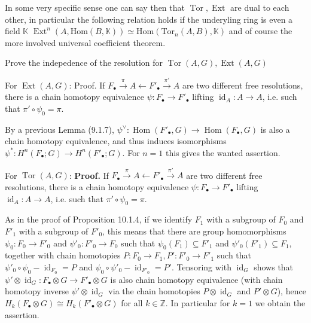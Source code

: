 In some very specific sense one can say then that \( \operatorname{Tor},\operatorname{Ext} \) are dual to each other,
in particular the following relation holds if the underyling ring is even a field \( \mathbb{K} \)
\( \operatorname{Ext}^n(A, \text{Hom}(B, \mathbb{K})) \simeq \text{Hom}(\text{Tor}_n(A, B), \mathbb{K}) \)
and of course the more involved universal coefficient theorem.


Prove the indepedence of the resolution for \( \operatorname{Tor}(A, G), \operatorname{Ext}(A, G) \)


For \( \operatorname{Ext}(A, G) \):
Proof. 
If \( F_{\bullet} \xrightarrow{\pi} A \leftarrow F'_{\bullet} \xrightarrow{\pi'} A \) are two different free resolutions, 
there is a chain homotopy equivalence \(\psi: F_{\bullet} \rightarrow F'_{\bullet}\) lifting \(\operatorname{id}_A : A \rightarrow A \), 
i.e. such that \(\pi' \circ \psi_0 = \pi\). 

By a previous Lemma (9.1.7), 
\(\psi^{\vee} : \operatorname{Hom}(F'_{\bullet}, G) \rightarrow \operatorname{Hom}(F_{\bullet}, G) \) is also a chain homotopy equivalence, 
and thus induces isomorphisms \(\psi^{\ast}: H^n(F_{\bullet}; G) \rightarrow H^n(F'_{\bullet}; G)\). 
For \(n = 1\) this gives the wanted assertion.


For \( \operatorname{Tor}(A, G) \):
\textbf{Proof.} 
If \( F_{\bullet} \xrightarrow{\pi} A \leftarrow F'_{\bullet} \xrightarrow{\pi'} A \) are two different free resolutions, 
there is a chain homotopy equivalence \(\psi: F_{\bullet} \rightarrow F'_{\bullet}\) lifting \(\operatorname{id}_A : A \rightarrow A \), 
i.e. such that \(\pi' \circ \psi_0 = \pi\). 

As in the proof of Proposition 10.1.4, if we identify \( F_1 \) with a subgroup of \( F_0 \) and \( F'_1 \) with a subgroup of \( F'_0 \), 
this means that there are group homomorphisms \(\psi_0 : F_0 \rightarrow F'_0 \) and \(\psi'_0: F'_0 \rightarrow F_0 \) such that 
\(\psi_0 (F_1) \subseteq F'_1 \) and \(\psi'_0 (F'_1) \subseteq F_1\), together with chain homotopies 
\( P : F_0 \rightarrow F_1, P' : F'_0 \rightarrow F'_1 \) 
such that \(\psi'_0 \circ \psi_0 - \operatorname{id}_{F_0} = P\) and \(\psi_0 \circ \psi'_0 - \operatorname{id}_{F'_0} = P'\). 
Tensoring with \(\operatorname{id}_G\) shows that 
\(\psi' \otimes \operatorname{id}_G : F_{\bullet} \otimes G \rightarrow F'_{\bullet} \otimes G \) 
is also chain homotopy equivalence 
(with chain homotopy inverse \(\psi' \otimes \operatorname{id}_G\) via the chain homotopies \( P \otimes \operatorname{id}_G\) and 
\( P' \otimes G\)), hence \( H_k (F_{\bullet} \otimes G) \cong H_k (F'_{\bullet} \otimes G)\) for all \( k \in \mathbb{Z}\). 
In particular for \( k = 1\) we obtain the assertion.


